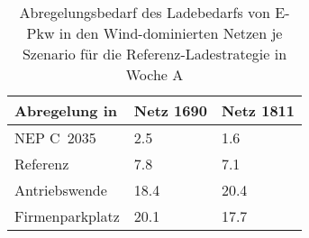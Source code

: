 {
\renewcommand{\arraystretch}{1.2}%
\begin{table}[H]
	\begin{center}
		\caption{Abregelungsbedarf des Ladebedarfs von E-Pkw in den Wind-dominierten Netzen je Szenario für die Referenz-Ladestrategie in Woche A}
		\begin{tabu} to 0.6\textwidth {X[1.5] X[1, r] X[1, r]}
			\toprule
			Abregelung in   \si{\mwh}    & Netz \num{1690} & Netz \num{1811} \\ \midrule
			NEP C~\num{2035}             & \num{2.5}       & \num{1.6}       \\
			Referenz                     & \num{7.8}       & \num{7.1}       \\
			Antriebswende                & \num{18.4}      & \num{20.4}      \\
			\glqq Firmenparkplatz\grqq{} & \num{20.1}      & \num{17.7}      \\ \bottomrule
		\end{tabu}
		\label{tab:wind_dominated_week_a_epkw_cur}
	\end{center}
	\vspace{-3mm}%
\end{table}
}